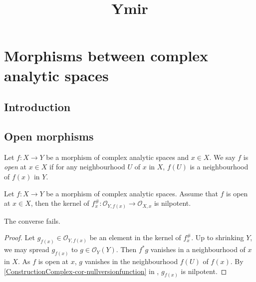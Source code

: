 



\title{Ymir}










\maketitle


\tableofcontents

\chapter*{Morphisms between complex analytic spaces}\label{chap-morphismscomplex}


\section{Introduction}\label{sec-introduction-morphismscomplex}

\section{Open morphisms}
\begin{definition}
    Let $f:X\rightarrow Y$ be a morphism of complex analytic spaces and $x\in X$. We say $f$ is \emph{open} at $x\in X$ if for any neighbourhood $U$ of $x$ in $X$, $f(U)$ is a neighbourhood of $f(x)$ in $Y$.
\end{definition}

\begin{proposition}\label{prop-openmapkernelnil}
    Let $f:X\rightarrow Y$ be a morphism of complex analytic spaces. Assume that $f$ is open at $x\in X$, then the kernel of $f_x^{\#}:\mathcal{O}_{Y,f(x)}\rightarrow \mathcal{O}_{X,x}$ is nilpotent.
\end{proposition}
The converse fails.
\begin{proof}
    Let $g_{f(x)}\in \mathcal{O}_{Y,f(x)}$ be an element in the kernel of $f_x^{\#}$. Up to shrinking $Y$, we may spread $g_{f(x)}$ to $g\in \mathcal{O}_Y(Y)$. Then $f^*g$ vanishes in a neighbourhood of $x$ in $X$. As $f$ is open at $x$, $g$ vanishes in the neighbourhood $f(U)$ of $f(x)$. By \cref{ConstructionComplex-cor-nullversionfunction} in , $g_{f(x)}$ is nilpotent.
\end{proof}



